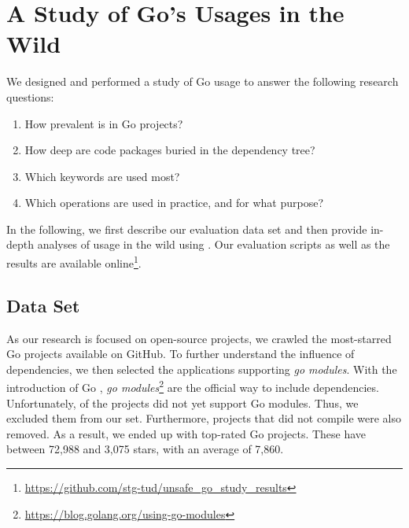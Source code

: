 \section{A Study of Go's \unsafe{} Usages in the Wild}
\label{sec:eval}


We designed and performed a study of Go \unsafe{} usage to answer the following research questions:

\begin{enumerate}[leftmargin=*,label={RQ\arabic*}]
    \item How prevalent is \unsafe{} in Go projects? \label{rq:prevalApp}
    \item How deep are \unsafe{} code packages buried in the dependency tree? \label{rq:depsDepth}
    \item Which \unsafe{} keywords are used most? \label{rq:distTypes}
    \item Which \unsafe{} operations are used in practice, and for what purpose? \label{rq:purpose}
\end{enumerate}

%

In the following, we first describe our evaluation data set and then provide in-depth analyses of \unsafe{} usage in the wild using \toolUsage{}.
Our evaluation scripts as well as the results are available online\footnote{\url{https://github.com/stg-tud/unsafe_go_study_results}}.







\subsection{Data Set}

As our research is focused on open-source projects, we crawled the \initalProjs{} most-starred Go projects available on GitHub. 
To further understand the influence of dependencies, we then selected the applications supporting \textit{go modules}.
With the introduction of Go , \textit{go modules}\footnote{\url{https://blog.golang.org/using-go-modules}} are the official way to include dependencies.
Unfortunately, \withoutModules{} of the projects did not yet support Go modules.
Thus, we excluded them from our set.
Furthermore, \notCompiled{} projects that did not compile were also removed.
As a result, we ended up with \projsAnalyzed{} top-rated Go projects. %
These have between 72,988 and 3,075 stars, with an average of 7,860. %



